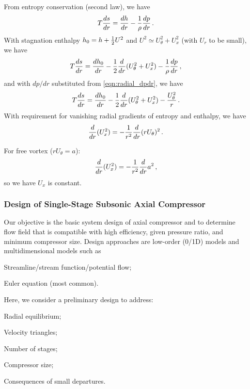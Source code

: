 From entropy conservation (second law), we have
\begin{equation}
  T {\frac{ds}{dr}} = {\frac{dh}{dr}} - {\frac{1}{\rho}} {\frac{dp}{dr}}\,.
\end{equation}
With stagnation enthalpy $h_0 = h + {\frac{1}{2}} U^2$ and $U^2 \simeq U_\theta^2 + U_x^2$ (with $U_r$ to be small), we have
\begin{equation}
  T {\frac{ds}{dr}} = {\frac{dh_0}{dr}} - {\frac{1}{2}} {\frac{d}{dr}} (U_\theta^2 + U_x^2) -  {\frac{1}{\rho}} {\frac{dp}{dr}}\,,
\end{equation}
and with $dp/dr$ substituted from \cref{eqn:radial_dpdr}, we have
\begin{equation}
  T {\frac{ds}{dr}} = {\frac{dh_0}{dr}} - {\frac{1}{2}} {\frac{d}{dr}} (U_\theta^2 + U_x^2) -  {\frac{U_\theta^2}{r}}\,.
\end{equation}
With requirement for vanishing radial gradients of entropy and enthalpy, we have
\begin{equation}
  \label{eqn:radial_equilibrium}
  {\frac{d}{dr}} (U_x^2) = - {\frac{1}{r^2}} {\frac{d}{dr}} (r U_\theta)^2\,.
\end{equation}

For free vortex ($rU_\theta = a$):
\[
  {\frac{d}{dr}} (U_x^2) = - {\frac{1}{r^2}} {\frac{d}{dr}} a^2 \,,
\]
so we have $U_x$ is constant.

\subsubsection{Design of Single-Stage Subsonic Axial Compressor}
Our objective is the basic system design of axial compressor and to determine flow field that is compatible with high efficiency, given pressure ratio, and minimum compressor size. Design approaches are low-order (0/1D) models and multidimensional models such as
\begin{itemizePacked}
\item Streamline/stream function/potential flow;
\item Euler equation (most common).
\end{itemizePacked}

Here, we consider a preliminary design to address:
\begin{itemizePacked}
\item Radial equilibrium;
\item Velocity triangles;
\item Number of stages;
\item Compressor size;
\item Consequences of small departures.
\end{itemizePacked}

